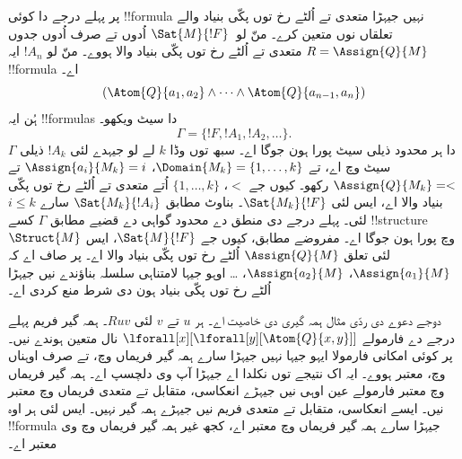 \documentclass[../../../include/open-logic-section]{subfiles}
\begin{document}
پر پہلے درجے دا کوئی !!{formula} نہیں جیہڑا متعدی تے اُلٹے رخ توں پکّی بنیاد والے تعلقاں نوں متعین کرے۔ منّ لو~$\Sat{M}{!F}$ اُدوں تے صرف اُدوں جدوں $R =
\Assign{Q}{M}$ متعدی تے اُلٹے رخ توں پکّی بنیاد والا ہووے۔ منّ لو $!A_n$ ایہ !!{formula} اے۔
\[
(\Atom{Q}{a_1,a_2} \land \dots \land
    \Atom{Q}{a_{n-1},a_{n}})
\]
ہُن ایہ !!{formula}s دا سیٹ ویکھو۔
\[
\Gamma = \{!F, !A_1, !A_2, \dots\}.
\]
$\Gamma$ دا ہر محدود ذیلی سیٹ پورا ہون جوگا اے۔ سبھ توں وڈا $k$ لے لو جیہدے لئی $!A_k$ ذیلی سیٹ وچ اے، تے $\Domain{M_k} = \{1, \dots, k\}$،
$\Assign{a_i}{M_k} = i$ تے $\Assign{Q}{M_k} = <$ رکھو۔ کیوں جے $<$، $\{1,
\dots, k\}$ اُتے متعدی تے اُلٹے رخ توں پکّی بنیاد والا اے، ایس لئی
$\Sat{M_k}{!F}$۔ بناوٹ مطابق $\Sat{M_k}{!A_i}$ سارے $i \le k$ لئی۔ پہلے درجے دی منطق دے محدود گواہی دے قضیے مطابق $\Gamma$ کسے !!{structure}~$\Struct{M}$ وچ پورا ہون جوگا اے۔ مفروضے مطابق، کیوں جے
$\Sat{M}{!F}$، ایس لئی تعلق $\Assign{Q}{M}$ اُلٹے رخ توں پکّی بنیاد والا اے۔ پر صاف اے کہ $\Assign{a_1}{M}$، $\Assign{a_2}{M}$،
\dots{} اوہو جیہا لامتناہی سلسلہ بناؤندے نیں جیہڑا اُلٹے رخ توں پکّی بنیاد ہون دی شرط منع کردی اے۔

دوجے دعوے دی ردّی مثال ہمہ گیری دی خاصیت اے۔ ہر $u$ تے $v$ لئی $Ruv$۔ ہمہ گیر فریم پہلے درجے دے فارمولے
$\lforall[x][\lforall[y][\Atom{Q}{x,y}]]$ نال متعین ہوندے نیں۔ پر کوئی امکانی فارمولا ایہو جیہا نہیں جیہڑا سارے ہمہ گیر فریماں وچ، تے صرف اوہناں وچ، معتبر ہووے۔ ایہ اک نتیجے توں نکلدا اے جیہڑا آپ وی دلچسپ اے۔ ہمہ گیر فریماں وچ معتبر فارمولے عین اوہی نیں جیہڑے انعکاسی، متقابل تے متعدی فریماں وچ معتبر نیں۔ ایسے انعکاسی، متقابل تے متعدی فریم نیں جیہڑے ہمہ گیر نہیں۔ ایس لئی ہر اوہ !!{formula} جیہڑا سارے ہمہ گیر فریماں وچ معتبر اے، کجھ غیر ہمہ گیر فریماں وچ وی معتبر اے۔
\end{document}

